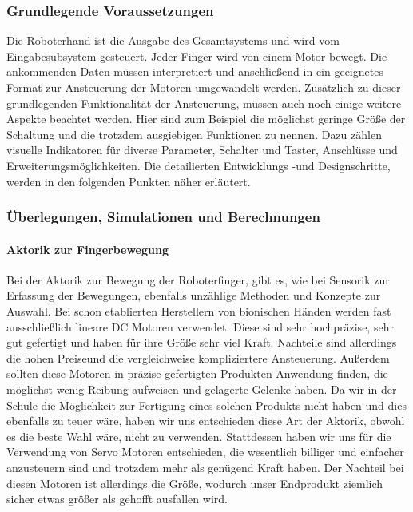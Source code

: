 \documentclass[titlepage,12pt,twoside]{article}
\begin{document}
\subsubsection{Grundlegende Voraussetzungen}
Die Roboterhand ist die Ausgabe des Gesamtsystems und wird vom Eingabesubsystem gesteuert. Jeder Finger wird von einem Motor 
bewegt. Die ankommenden Daten müssen interpretiert und anschließend in ein geeignetes Format zur Ansteuerung der Motoren
umgewandelt werden. Zusätzlich zu dieser grundlegenden Funktionalität der Ansteuerung, müssen auch noch einige weitere Aspekte
beachtet werden. Hier sind zum Beispiel die möglichst geringe Größe der Schaltung und die trotzdem ausgiebigen Funktionen 
zu nennen. Dazu zählen visuelle Indikatoren für diverse Parameter, Schalter und Taster, Anschlüsse und Erweiterungsmöglichkeiten.
Die detailierten Entwicklungs -und Designschritte, werden in den folgenden Punkten näher erläutert. \\

\subsubsection{Überlegungen, Simulationen und Berechnungen}
\paragraph{Aktorik zur Fingerbewegung}
\hfill \break
\hfill \break
Bei der Aktorik zur Bewegung der Roboterfinger, gibt es, wie bei Sensorik zur Erfassung der Bewegungen, ebenfalls unzählige Methoden
und Konzepte zur Auswahl. Bei schon etablierten Herstellern von bionischen Händen werden fast ausschließlich lineare DC Motoren 
verwendet. Diese sind sehr hochpräzise, sehr gut gefertigt und haben für ihre Größe sehr viel Kraft. Nachteile sind allerdings
die hohen Preiseund die vergleichweise kompliziertere Ansteuerung. Außerdem sollten diese Motoren in präzise gefertigten Produkten
Anwendung finden, die möglichst wenig Reibung aufweisen und gelagerte Gelenke haben. Da wir in der Schule die Möglichkeit zur Fertigung 
eines solchen Produkts nicht haben und dies ebenfalls zu teuer wäre, haben wir uns entschieden diese Art der Aktorik, obwohl es die beste Wahl wäre,
nicht zu verwenden. Stattdessen haben wir uns für die Verwendung von Servo Motoren entschieden, die wesentlich billiger und einfacher anzusteuern sind und trotzdem mehr als
genügend Kraft haben. Der Nachteil bei diesen Motoren ist allerdings die Größe, wodurch unser Endprodukt ziemlich sicher etwas größer als gehofft
ausfallen wird. \\
\end{document}
